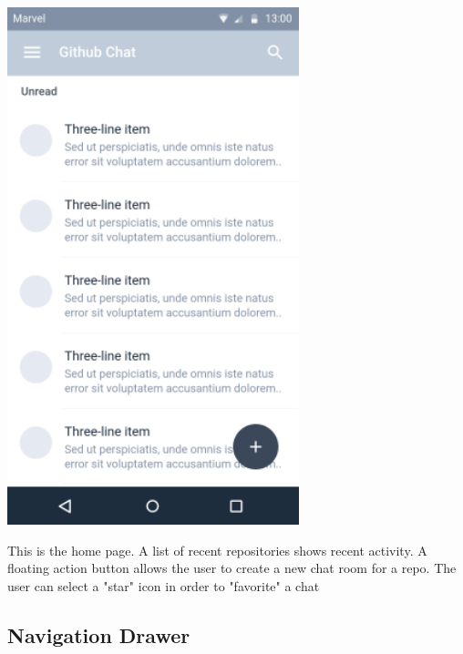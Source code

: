 \documentclass{report}
\begin{document}
\begin{center}
    \includegraphics[scale=0.6]{design-home}
\end{center}

This is the home page. A list of recent repositories shows recent activity. A floating action button allows the user to create a new chat room for a repo. The user can select a "star" icon in order to "favorite" a chat

\newpage
\subsection{Navigation Drawer}
\end{document}
